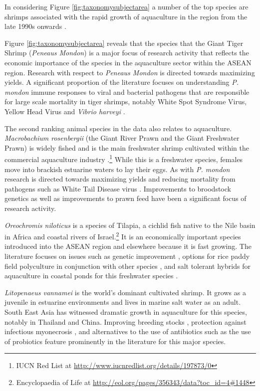 \documentclass[]{book}
\theoremstyle{definition}
\theoremstyle{definition}
\theoremstyle{definition}
\theoremstyle{remark}
\begin{document}
In considering Figure \ref{fig:taxonomysubjectarea} a number of the top
species are shrimps associated with the rapid growth of aquaculture in
the region from the late 1990s onwards \citep{Hishamunda_2009}.

Figure \ref{fig:taxonomysubjectarea} reveals that the species that the
Giant Tiger Shrimp (\emph{Peneaus Mondon}) is a major focus of research
activity that reflects the economic importance of the species in the
aquaculture sector within the ASEAN region. Research with respect to
\emph{Peneaus Mondon} is directed towards maximizing yields. A
significant proportion of the literature focuses on understanding
\emph{P. mondon} immune responses to viral and bacterial pathogens that
are responsible for large scale mortality in tiger shrimps, notably
White Spot Syndrome Virus, Yellow Head Virus and \emph{Vibrio harveyi}
\citep{Wongteerasupaya_1995, Ponprateep_2011, Jaree_2012}.

The second ranking animal species in the data also relates to
aquaculture. \emph{Macrobachium rosenbergii} (the Giant River Prawn and
the Giant Freshwater Prawn) is widely fished and is the main freshwater
shrimp cultivated within the commercial aquaculture industry
\citep{Macrobrachium_2012}.\footnote{IUCN Red List at
  \url{http://www.iucnredlist.org/details/197873/0}} While this is a
freshwater species, females move into brackish estuarine waters to lay
their eggs. As with \emph{P. mondon} research is directed towards
maximizing yields and reducing mortality from pathogens such as White
Tail Disease virus \citep{Bonami_2011}. Improvements to broodstock
genetics \citep{Karaket_2012, Nguyen_Thanh_2015, Thanh_2010} as well as
improvements to prawn feed \citep{Kangpanich_2016} have been a
significant focus of research activity.

\emph{Oreochromis niloticus} is a species of Tilapia, a cichlid fish
native to the Nile basin in Africa and coastal rivers of
Israel.\footnote{Encyclopaedia of Life at
  \url{http://eol.org/pages/356343/data?toc_id=4\#1448}} It is an
economically important species introduced into the ASEAN region and
elsewhere because it is fast growing. The literature focuses on issues
such as genetic improvement \citep{Bentsen_1998}, options for rice paddy
field polyculture in conjunction with other species \citep{Vromant_2002}
, and salt tolerant hybrids for aquaculture in coastal ponds for this
freshwater species \citep{Kamal_2005}.

\emph{Litopenaeus vannamei} is the world's dominant cultivated shrimp.
It grows as a juvenile in estuarine environments and lives in marine
salt water as an adult. South East Asia has witnessed dramatic growth in
aquaculture for this species, notably in Thailand and China. Improving
breeding stocks \citep{Nimrat_2006}, protection against infectious
myonecrosis \citep{Silva_2010}, and alternatives to the use of
antibiotics such as the use of probiotics \citep{Nimrat_2011} feature
prominently in the literature for this major species.
\end{document}
